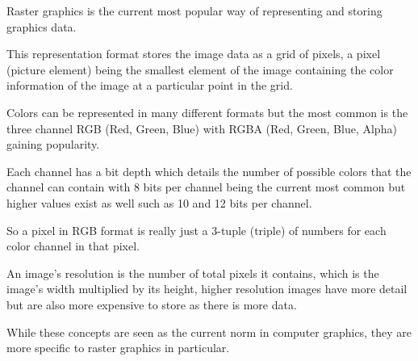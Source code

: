 \documentclass[12pt]{article}
\newcommand{\sentence}{} %
\begin{document}
    \tab
    Raster graphics is the current most popular way of representing and storing graphics data.
    \sentence
    This representation format stores the image data as a grid of pixels, a pixel (picture element) being the
    smallest element of the image containing the color information of the image at a particular point in the grid\cite{foley1994introduction}.
    \sentence
    Colors can be represented in many different formats but the most common is the three channel RGB (Red, Green, Blue)
    with RGBA (Red, Green, Blue, Alpha) gaining popularity.
    \sentence
    Each channel has a bit depth which details the number of possible colors that the channel can contain with 8 bits
    per channel being the current most common but higher values exist as well such as 10 and 12 bits per channel\cite{foley1994introduction}.
    \sentence
    So a pixel in RGB format is really just a 3-tuple (triple) of numbers for each color channel in that pixel.
    \sentence
    An image's resolution is the number of total pixels it contains, which is the image's width multiplied by its
    height, higher resolution images have more detail but are also more expensive to store as there is more data.
    \sentence
    While these concepts are seen as the current norm in computer graphics, they are more specific to raster graphics
    in particular.
    \sentence
\end{document}
